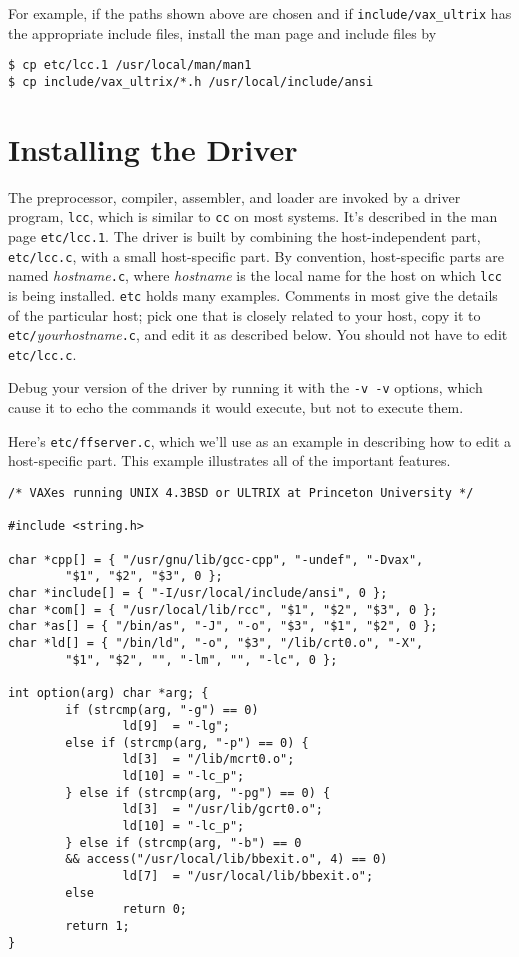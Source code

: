 For example, if the paths shown above are chosen and if
\verb|include/vax_ultrix| has the appropriate include files,
install the man page and include files by
\begin{verbatim}
$ cp etc/lcc.1 /usr/local/man/man1
$ cp include/vax_ultrix/*.h /usr/local/include/ansi
\end{verbatim}


\section{Installing the Driver}

The preprocessor, compiler, assembler, and loader are
invoked by a driver program, \verb|lcc|, which is similar
to \verb|cc| on most systems. It's described in the man page
\verb|etc/lcc.1|.
The driver is built by combining the host-independent
part, \verb|etc/lcc.c|, with a small host-specific part.
By convention, host-specific parts are named {\it hostname}\verb|.c|,
where {\it hostname\/} is the local name for the host on which \verb|lcc|
is being installed. \verb|etc| holds many examples.
Comments in most give the details of the
particular host; pick one that is closely related to your host,
copy it to \verb|etc/|{\it yourhostname}\verb|.c|,
and edit it as described below.
You should not have to edit \verb|etc/lcc.c|.

Debug your version of the driver by running it
with the \verb|-v -v| options, which cause it to echo the
commands it would execute, but not to execute them.

Here's \verb|etc/ffserver.c|, which we'll use as an example
in describing how to edit a host-specific part.
This example illustrates all of the important features.
\begin{verbatim}
/* VAXes running UNIX 4.3BSD or ULTRIX at Princeton University */

#include <string.h>

char *cpp[] = { "/usr/gnu/lib/gcc-cpp", "-undef", "-Dvax",
        "$1", "$2", "$3", 0 };
char *include[] = { "-I/usr/local/include/ansi", 0 };
char *com[] = { "/usr/local/lib/rcc", "$1", "$2", "$3", 0 };
char *as[] = { "/bin/as", "-J", "-o", "$3", "$1", "$2", 0 };
char *ld[] = { "/bin/ld", "-o", "$3", "/lib/crt0.o", "-X",
        "$1", "$2", "", "-lm", "", "-lc", 0 };

int option(arg) char *arg; {
        if (strcmp(arg, "-g") == 0)
                ld[9]  = "-lg";
        else if (strcmp(arg, "-p") == 0) {
                ld[3]  = "/lib/mcrt0.o";
                ld[10] = "-lc_p";
        } else if (strcmp(arg, "-pg") == 0) {
                ld[3]  = "/usr/lib/gcrt0.o";
                ld[10] = "-lc_p";
        } else if (strcmp(arg, "-b") == 0
        && access("/usr/local/lib/bbexit.o", 4) == 0)
                ld[7]  = "/usr/local/lib/bbexit.o";
        else
                return 0;
        return 1;
}
\end{verbatim}

